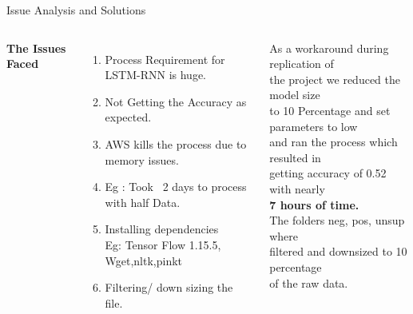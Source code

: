 \documentclass[aspectratio=169,xcolor=dvipsnames]{beamer}
\begin{document}
\begin{frame}{Issue Analysis and Solutions}
    \begin{columns}[c] %

        \textbf{The Issues Faced}
        \begin{enumerate}
            \item Process Requirement for LSTM-RNN is huge.
            \item Not Getting the Accuracy as expected.
            \item AWS kills the process due to memory issues.
            \item Eg : Took ~2 days to process with half Data.
            \item Installing dependencies\\ Eg: \alert{Tensor Flow 1.15.5, Wget,nltk,pinkt} 
            \item Filtering/ down sizing the file.
        \end{enumerate}

         As a workaround during replication of\\ the project
         we reduced the model size\\ to 10 Percentage and 
         set parameters to low \\and ran the process
         which resulted in\\ getting \alert{accuracy of 0.52} with nearly \\ \textbf{7 hours of time.}\\
         The folders neg, pos, unsup where \\ filtered and \alert{downsized 
         to 10 percentage}\\ of the raw data.


    \end{columns}
\end{frame}
   
\end{document}
